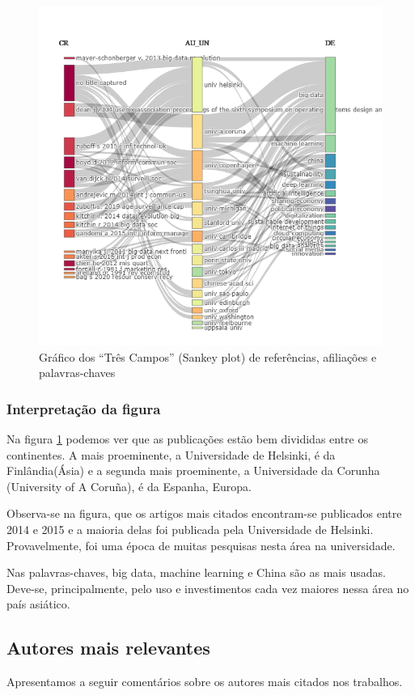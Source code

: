\begin{figure}[ht]
    \centering
    \includegraphics[width=12cm]{experiments/Tong00020/PesquisaBibliometrica/DataSet/MASSA@Tong00020-Three Fields Plot Affiliations References Keywords.png}
    \caption{Gráfico dos “Três Campos” (Sankey plot) de referências, afiliações e palavras-chaves}
    \label{fig:g-tres}
\end{figure}

\subsubsection{Interpretação da figura}
Na figura \ref{fig:g-tres} podemos ver que as publicações estão bem divididas entre os continentes. A mais proeminente, a Universidade de Helsinki, é da Finlândia(Ásia) e a segunda mais proeminente, a Universidade da Corunha (University of A Coruña), é da Espanha, Europa.

Observa-se na figura, que os artigos mais citados encontram-se publicados entre 2014 e 2015 e a maioria delas foi publicada pela Universidade de Helsinki. Provavelmente, foi uma época de muitas pesquisas nesta área na universidade.

Nas palavras-chaves, big data, machine learning e China são as mais usadas. Deve-se, principalmente, pelo uso e investimentos cada vez maiores nessa área no país asiático.


\subsection{Autores mais relevantes}
Apresentamos a seguir comentários sobre os autores mais citados nos trabalhos.

